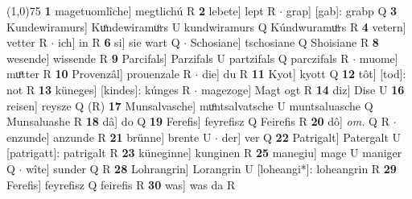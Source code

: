 \documentclass[8pt,a4paper,notitlepage]{article}
\begin{document}
\begin{table}[ht]
\begin{minipage}[t]{0.5\linewidth}
\line(1,0){75} \newline
\textbf{1} magetuomlîche] megtlichú R \textbf{2} lebete] lept R  $\cdot$ grap] [gab]: grabp Q \textbf{3} Kundewiramurs] Kuͦndewiramuͦrs U kundwiramurs Q Kúndwuramuͦrs R \textbf{4} vetern] vetter R  $\cdot$ ich] in R \textbf{6} si] sie wart Q  $\cdot$ Schosiane] tschosiane Q Shoisiane R \textbf{8} wesende] wissende R \textbf{9} Parcifals] Parzifals U partzifals Q parczifals R  $\cdot$ muome] muͦtter R \textbf{10} Provenzâl] prouenzale R  $\cdot$ die] du R \textbf{11} Kyot] kyott Q \textbf{12} tôt] [tod]: not R \textbf{13} küneges] [kindes]: kúnges R  $\cdot$ magezoge] Magt ogt R \textbf{14} diz] Dise U \textbf{16} reisen] reysze Q (R) \textbf{17} Munsalvasche] muͦntsalvatsche U muntsaluasche Q Munsaluashe R \textbf{18} dâ] do Q \textbf{19} Ferefis] feyrefisz Q Feirefis R \textbf{20} dô] \textit{om.} Q R  $\cdot$ enzunde] anzunde R \textbf{21} brünne] brente U  $\cdot$ der] ver Q \textbf{22} Patrigalt] Patergalt U [patrigatt]: patrigalt R \textbf{23} küneginne] kunginen R \textbf{25} manegiu] mage U maniger Q  $\cdot$ wîte] sunder Q R \textbf{28} Lohrangrin] Lorangrin U [loheangi*]: loheangrin R \textbf{29} Ferefis] feyrefisz Q feirefis R \textbf{30} was] was da R \newline
\end{minipage}
\end{table}
\end{document}
